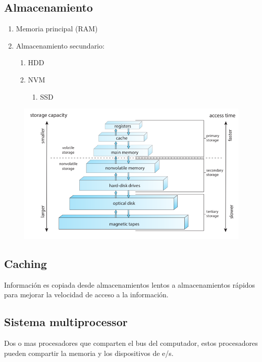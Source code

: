 \documentclass{templateNote}
\begin{document}
\subsection*{Almacenamiento}
\begin{enumerate}
    \item Memoria principal (RAM)
    \item Almacenamiento secundario:
    \begin{enumerate}
        \item HDD
        \item NVM
        \begin{enumerate}
            \item SSD
        \end{enumerate}
    \end{enumerate}
\end{enumerate}

\begin{figure}[H]
    \centering
    \includegraphics[width=\textwidth]{img/almacenamiento.png}
\end{figure}

\subsection*{Caching}
Información es copiada desde almacenamientos lentos a almacenamientos rápidos para mejorar la velocidad de acceso a la información.

\subsection*{Sistema multiprocessor}
Dos o mas procesadores que comparten el bus del computador, estos procesadores pueden compartir la memoria y los dispositivos de e/s.
\end{document}
